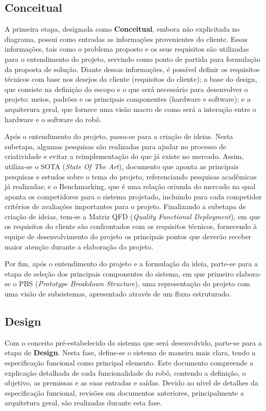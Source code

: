 \subsection{Conceitual}
\label{subsec:metodologia_conceitual}

A primeira etapa, designada como \textbf{Conceitual}, embora não explicitada no diagrama, possui como entradas as informações provenientes do cliente. Essas informações, tais como o problema proposto e os seus requisitos são utilizadas para o entendimento do projeto, servindo como ponto de partida para formulação da proposta de solução. Diante dessas informações, é possível definir os requisitos técnicos com base nos desejos do cliente (requisitos do cliente); a base do design, que consiste na definição do escopo e o que será necessário para desenvolver o projeto: meios, padrões e os principais componentes (hardware e software); e a arquiterura geral, que fornece uma visão macro de como será a interação entre o hardware e o software do robô. 

Após o entendimento do projeto, passa-se para a criação de ideias. Nesta subetapa, algumas pesquisas são realizadas para ajudar no processo de criatividade e evitar a reimplementação do que já existe no mercado. Assim, utiliza-se o SOTA (\textit{State Of The Art}), documento que aponta as principais pesquisas  e estudos sobre o tema do projeto, referenciando pesquisas acadêmicas já realizadas; e o Benchmarking, que é uma relação oriunda do mercado na qual aponta os competidores para o sistema projetado, incluindo para cada competidor critérios de avaliações importantes para o projeto. Finalizando a subetapa de criação de ideias, tem-se a Matriz QFD (\textit{Quality Functional Deployment}), em que os requisitos do cliente são confrontados com os requisitos técnicos, fornecendo à equipe de desenvolvimento do projeto os principais pontos que deverão receber maior atenção durante a elaboração do projeto. 

Por fim, após o entendimento do projeto e a formulação da ideia, parte-se para a etapa de seleção dos principais componentes do  sistema, em que primeiro elabora-se o PBS (\textit{Prototype Breakdown Structure}), uma representação do projeto com uma visão de subsistemas, apresentado através de um fluxo estruturado.

\subsection{Design}
\label{subsec:metodologia_design}
Com o conceito pré-estabelecido do sistema que será desenvolvido, parte-se para a etapa de \textbf{Design}. Nesta fase, define-se o sistema de maneira mais clara, tendo a especificação funcional como principal elemento. Este documento compreende a explicação  detalhada de cada funcionalidade do robô, contendo a definição, o objetivo, as premissas e as suas entradas e saídas. Devido ao nível de detalhes da especificação funcional, revisões em documentos anteriores, principalmente a arquitetura geral, são realizadas durante esta fase. 


